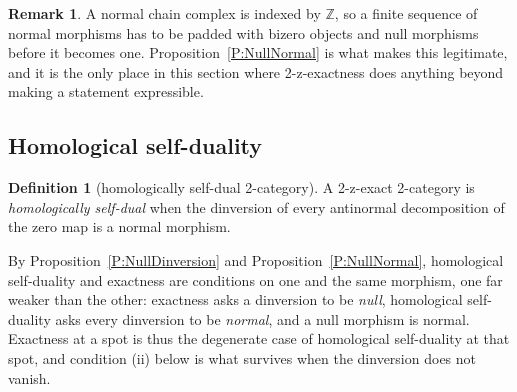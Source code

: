 \documentclass[reqno,a4paper]{amsart}
\numberwithin{equation}{section}
\theoremstyle{plain}
\theoremstyle{definition}
\newtheorem{definition}[subsection]{Definition}
\newtheorem{remark}[subsection]{Remark}
\def\nameit#1{\textrm{#1}~}
\def\prox{\nameit{Proposition}}
\def\dfn#1{{\itshape #1}}
\renewcommand{\1}{\onecat{1}}
\begin{document}
\begin{remark}\label{Rem Padding}
	A normal chain complex is indexed by \(\mathbb{Z}\), so a finite sequence of normal morphisms has to be padded with bizero objects and null morphisms before it becomes one. \prox\ref{P:NullNormal} is what makes this legitimate, and it is the only place in this section where 2-z-exactness does anything beyond making a statement expressible.
\end{remark}

\subsection{Homological self-duality}\label{SS:HSD}

\begin{definition}[homologically self-dual 2-category]\label{Def:HSD}
	A 2-z-exact 2-category is \dfn{homologically self-dual} when the dinversion of every antinormal decomposition of the zero map is a normal morphism.
\end{definition}

By \prox\ref{P:NullDinversion} and \prox\ref{P:NullNormal}, homological self-duality and exactness are conditions on one and the same morphism, one far weaker than the other: exactness asks a dinversion to be \emph{null}, homological self-duality asks every dinversion to be \emph{normal}, and a null morphism is normal. Exactness at a spot is thus the degenerate case of homological self-duality at that spot, and condition (ii) below is what survives when the dinversion does not vanish.
\end{document}
